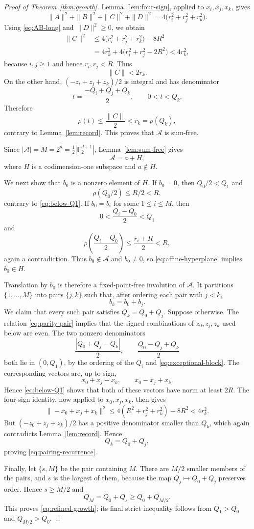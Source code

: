 \documentclass[10pt,a4paper]{amsart}
\newcommand{\F}{\mathbb F}
\begin{document}
\begin{proof}[Proof of Theorem~\ref{thm:growth}]
Lemma~\ref{lem:four-sign}, applied to $x_i,x_j,x_k$, gives
$$
 \|A\|^2+\|B\|^2+\|C\|^2+\|D\|^2
 =4\bigl(r_i^2+r_j^2+r_k^2\bigr).
$$
Using \eqref{eq:AB-long} and $\|D\|^2\ge0$, we obtain
$$
 \begin{aligned}
 \|C\|^2
 &\le4\bigl(r_i^2+r_j^2+r_k^2\bigr)-8R^2\\
 &=4r_k^2+4\bigl(r_i^2+r_j^2-2R^2\bigr)
 <4r_k^2,
 \end{aligned}
$$
because $i,j\ge1$ and hence $r_i,r_j<R$. Thus
\begin{equation}\label{eq:C-short}
 \|C\|<2r_k.
\end{equation}
On the other hand, $(-z_i+z_j+z_k)/2$ is integral and has denominator
$$
 t=\frac{-Q_i+Q_j+Q_k}{2},
 \qquad 0<t<Q_k.
$$
Therefore
$$
 \rho(t)\le\frac{\|C\|}{2}<r_k=\rho(Q_k),
$$
contrary to Lemma~\ref{lem:record}. This proves that $\mathcal A$ is
sum-free.

Since $|\mathcal A|=M=2^d=\frac12|\F_2^{d+1}|$,
Lemma~\ref{lem:sum-free} gives
\begin{equation}\label{eq:affine-hyperplane}
 \mathcal A=a+H,
\end{equation}
where $H$ is a codimension-one subspace and $a\notin H$.

We next show that $b_0$ is a nonzero element of $H$. If $b_0=0$, then
$Q_0/2<Q_1$ and
$$
 \rho(Q_0/2)\le R/2<R,
$$
contrary to \eqref{eq:below-Q1}. If $b_0=b_i$ for some $1\le i\le M$, then
$$
 0<\frac{Q_i-Q_0}{2}<Q_1
$$
and
$$
 \rho\left(\frac{Q_i-Q_0}{2}\right)
 \le\frac{r_i+R}{2}<R,
$$
again a contradiction. Thus $b_0\notin\mathcal A$ and $b_0\ne0$, so
\eqref{eq:affine-hyperplane} implies $b_0\in H$.

Translation by $b_0$ is therefore a fixed-point-free involution of
$\mathcal A$. It partitions $\{1,\ldots,M\}$ into pairs $\{j,k\}$ such that,
after ordering each pair with $j<k$,
\begin{equation}\label{eq:parity-pair}
 b_k=b_0+b_j.
\end{equation}
We claim that every such pair satisfies $Q_k=Q_0+Q_j$. Suppose otherwise.
The relation \eqref{eq:parity-pair} implies that the signed combinations of
$z_0,z_j,z_k$ used below are even. The two nonzero denominators
$$
 \frac{|Q_0+Q_j-Q_k|}{2},
 \qquad
 \frac{Q_0-Q_j+Q_k}{2}
$$
both lie in $(0,Q_1)$, by the ordering of the $Q_i$ and
\eqref{eq:exceptional-block}. The corresponding vectors are,
up to sign,
$$
 x_0+x_j-x_k,\qquad x_0-x_j+x_k.
$$
Hence \eqref{eq:below-Q1} shows that both of these vectors have norm at
least $2R$. The four-sign identity, now applied
to $x_0,x_j,x_k$, then gives
$$
 \|-x_0+x_j+x_k\|^2
 \le4(R^2+r_j^2+r_k^2)-8R^2
 <4r_k^2.
$$
But $(-z_0+z_j+z_k)/2$ has a positive denominator smaller than $Q_k$, which
again contradicts Lemma~\ref{lem:record}. Hence
$$
 Q_k=Q_0+Q_j,
$$
proving \eqref{eq:pairing-recurrence}.

Finally, let $\{s,M\}$ be the pair containing $M$. There are $M/2$ smaller
members of the pairs, and $s$ is the largest of them, because the map
$Q_j\mapsto Q_0+Q_j$ preserves order. Hence $s\ge M/2$ and
$$
 Q_M=Q_0+Q_s\ge Q_0+Q_{M/2}.
$$
This proves \eqref{eq:refined-growth}; its final strict inequality follows
from $Q_1>Q_0$ and $Q_{M/2}>Q_0$.
\end{proof}
\end{document}
